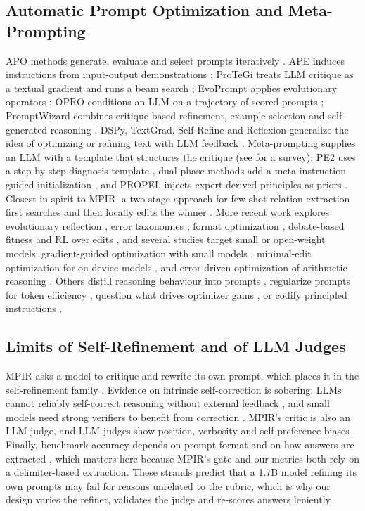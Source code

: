 \documentclass{ieeeaccess}
\begin{document}
\subsection{Automatic Prompt Optimization and Meta-Prompting}

APO methods generate, evaluate and select prompts iteratively \cite{ramnath2025}. APE induces instructions from input-output demonstrations \cite{zhou2023}; ProTeGi treats LLM critique as a textual gradient and runs a beam search \cite{pryzant2023}; EvoPrompt applies evolutionary operators \cite{guo2024}; OPRO conditions an LLM on a trajectory of scored prompts \cite{yang2024}; PromptWizard combines critique-based refinement, example selection and self-generated reasoning \cite{agarwal2025}. DSPy, TextGrad, Self-Refine and Reflexion generalize the idea of optimizing or refining text with LLM feedback \cite{khattab2024,yuksekgonul2025,madaan2023,shinn2023}. Meta-prompting supplies an LLM with a template that structures the critique (see \cite{cui2025} for a survey): PE2 uses a step-by-step diagnosis template \cite{ye2024}, dual-phase methods add a meta-instruction-guided initialization \cite{yang2024b}, and PROPEL injects expert-derived principles as priors \cite{mayilvaghanan2025}. Closest in spirit to MPIR, a two-stage approach for few-shot relation extraction first searches and then locally edits the winner \cite{chakma2026}. More recent work explores evolutionary reflection \cite{agrawal2026}, error taxonomies \cite{singh2026}, format optimization \cite{liu2025}, debate-based fitness \cite{nair2025} and RL over edits \cite{lin2025}, and several studies target small or open-weight models: gradient-guided optimization with small models \cite{das2025}, minimal-edit optimization for on-device models \cite{shim2026}, and error-driven optimization of arithmetic reasoning \cite{pandy2026}. Others distill reasoning behaviour into prompts \cite{badhe2026}, regularize prompts for token efficiency \cite{shah2026}, question what drives optimizer gains \cite{zhu2025}, or codify principled instructions \cite{bsharat2023}.

\subsection{Limits of Self-Refinement and of LLM Judges}

MPIR asks a model to critique and rewrite its own prompt, which places it in the self-refinement family \cite{madaan2023,shinn2023}. Evidence on intrinsic self-correction is sobering: LLMs cannot reliably self-correct reasoning without external feedback \cite{huang2024}, and small models need strong verifiers to benefit from correction \cite{zhang2024}. MPIR's critic is also an LLM judge, and LLM judges show position, verbosity and self-preference biases \cite{zheng2023,wang2024c,panickssery2024}. Finally, benchmark accuracy depends on prompt format and on how answers are extracted \cite{sclar2024,wang2024d,zheng2024c}, which matters here because MPIR's gate and our metrics both rely on a delimiter-based extraction. These strands predict that a 1.7B model refining its own prompts may fail for reasons unrelated to the rubric, which is why our design varies the refiner, validates the judge and re-scores answers leniently.
\end{document}
